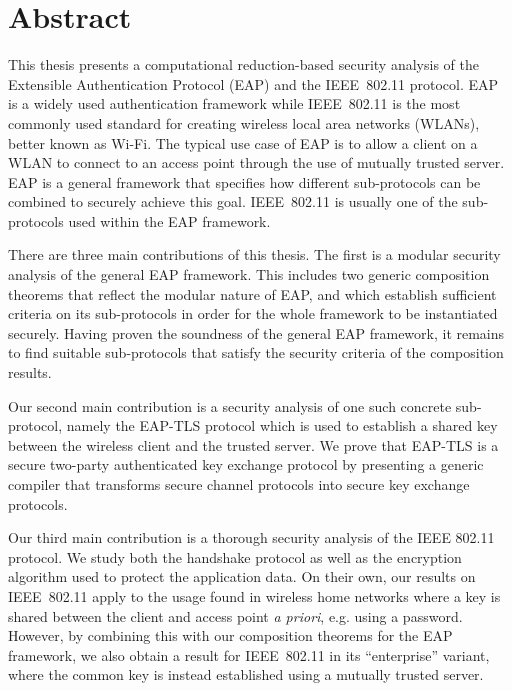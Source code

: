\chapter*{Abstract}

This thesis presents a computational reduction-based security analysis of the Extensible Authentication Protocol (EAP)
and the IEEE~802.11 protocol.
EAP is a widely used authentication framework while IEEE~802.11 is the most commonly used standard for creating wireless local area networks (WLANs),
better known as Wi-Fi.
The typical use case of EAP is to allow a client on a WLAN to connect to an access point through the use of mutually trusted server.
EAP is a general framework that specifies how different sub-protocols can be combined to securely achieve this goal.
IEEE~802.11 is usually one of the sub-protocols used within the EAP framework.


There are three main contributions of this thesis.
The first is a modular security analysis of the general EAP framework.
This includes two generic composition theorems that reflect the modular nature of EAP,
and which establish sufficient criteria on its sub-protocols in order for the whole framework to be instantiated securely. 
Having proven the soundness of the general EAP framework,
it remains to find suitable sub-protocols that satisfy the security criteria of the composition results. 

Our second main contribution is a security analysis of one such concrete sub-protocol,
namely the EAP-TLS protocol which is used to establish a shared key between the wireless client and the trusted server.
We prove that EAP-TLS is a secure two-party authenticated key exchange protocol
by presenting a generic compiler that transforms secure channel protocols into secure key exchange protocols.

Our third main contribution is a thorough security analysis of the IEEE 802.11 protocol.
We study both the handshake protocol as well as the encryption algorithm used to protect the application data.
On their own,
our results on IEEE~802.11 apply to the usage found in wireless home networks where a key is shared between the client and access point \emph{a priori},
e.g. using a password.
However,
by combining this with our composition theorems for the EAP framework,
we also obtain a result for IEEE~802.11 in its ``enterprise'' variant,
where the common key is instead established using a mutually trusted server.

